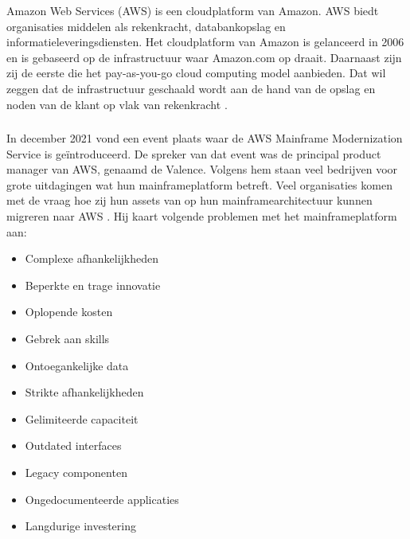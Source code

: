Amazon Web Services (AWS) is een cloudplatform van Amazon. AWS biedt organisaties middelen als rekenkracht, databankopslag en informatieleveringsdiensten. Het cloudplatform van Amazon is gelanceerd in 2006 en is gebaseerd op de infrastructuur waar Amazon.com op draait. Daarnaast zijn zij de eerste die het pay-as-you-go cloud computing model aanbieden. Dat wil zeggen dat de infrastructuur geschaald wordt aan de hand van de opslag en noden van de klant op vlak van rekenkracht \autocite{Gillis2020}.

\subsubsection{}
\label{sec:AWS Mainframe Modernization Service }

In december 2021 vond een event plaats waar de AWS Mainframe Modernization Service is geïntroduceerd. De spreker van dat event was de principal product manager van AWS, genaamd de Valence. Volgens hem staan veel bedrijven voor grote uitdagingen wat hun mainframeplatform betreft. Veel organisaties komen met de vraag hoe zij hun assets van op hun mainframearchitectuur kunnen migreren naar AWS \autocite{Valence2021}. Hij kaart volgende problemen met het mainframeplatform aan: 
 \begin{itemize}
    \item Complexe afhankelijkheden
    \item Beperkte en trage innovatie
    \item Oplopende kosten
    \item Gebrek aan skills
    \item Ontoegankelijke data
    \item Strikte afhankelijkheden
    \item Gelimiteerde capaciteit
    \item Outdated interfaces 
    \item Legacy componenten
    \item Ongedocumenteerde applicaties 
    \item Langdurige investering 
\end{itemize}

